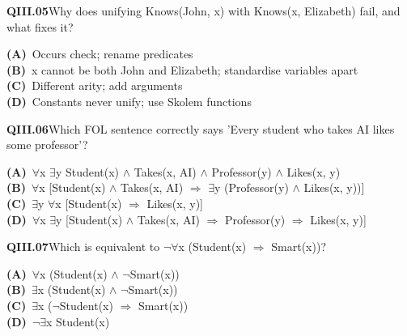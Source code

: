 \documentclass[11pt]{article}
\begin{document}
\begin{tcolorbox}[enhanced,breakable,colback=white,colframe=navyL,arc=2mm,boxrule=0.7pt,left=3mm,right=3mm,top=2mm,bottom=2mm]
\textbf{\color{navy}QIII.05}\quad Why does unifying Knows(John, x) with Knows(x, Elizabeth) fail, and what fixes it?\hfill{}\par\smallskip
{\small \textbf{\color{navyL}(A)}\ Occurs check; rename predicates\\[1pt]\textbf{\color{navyL}(B)}\ x cannot be both John and Elizabeth; standardise variables apart\\[1pt]\textbf{\color{navyL}(C)}\ Different arity; add arguments\\[1pt]\textbf{\color{navyL}(D)}\ Constants never unify; use Skolem functions}
\end{tcolorbox}
\begin{tcolorbox}[enhanced,breakable,colback=white,colframe=navyL,arc=2mm,boxrule=0.7pt,left=3mm,right=3mm,top=2mm,bottom=2mm]
\textbf{\color{navy}QIII.06}\quad Which FOL sentence correctly says 'Every student who takes AI likes some professor'?\hfill{}\par\smallskip
{\small \textbf{\color{navyL}(A)}\ $\forall$x $\exists$y Student(x) $\wedge$ Takes(x, AI) $\wedge$ Professor(y) $\wedge$ Likes(x, y)\\[1pt]\textbf{\color{navyL}(B)}\ $\forall$x [Student(x) $\wedge$ Takes(x, AI) $\Rightarrow$ $\exists$y (Professor(y) $\wedge$ Likes(x, y))]\\[1pt]\textbf{\color{navyL}(C)}\ $\exists$y $\forall$x [Student(x) $\Rightarrow$ Likes(x, y)]\\[1pt]\textbf{\color{navyL}(D)}\ $\forall$x $\exists$y [Student(x) $\wedge$ Takes(x, AI) $\Rightarrow$ Professor(y) $\Rightarrow$ Likes(x, y)]}
\end{tcolorbox}
\begin{tcolorbox}[enhanced,breakable,colback=white,colframe=navyL,arc=2mm,boxrule=0.7pt,left=3mm,right=3mm,top=2mm,bottom=2mm]
\textbf{\color{navy}QIII.07}\quad Which is equivalent to $\neg$$\forall$x (Student(x) $\Rightarrow$ Smart(x))?\hfill{}\par\smallskip
{\small \textbf{\color{navyL}(A)}\ $\forall$x (Student(x) $\wedge$ $\neg$Smart(x))\\[1pt]\textbf{\color{navyL}(B)}\ $\exists$x (Student(x) $\wedge$ $\neg$Smart(x))\\[1pt]\textbf{\color{navyL}(C)}\ $\exists$x ($\neg$Student(x) $\Rightarrow$ Smart(x))\\[1pt]\textbf{\color{navyL}(D)}\ $\neg$$\exists$x Student(x)}
\end{tcolorbox}
\end{document}
